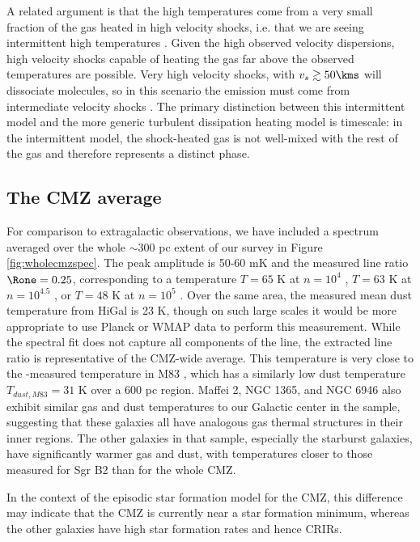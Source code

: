 A related argument is that the high temperatures come from a very small
fraction of the gas heated in high velocity shocks, i.e. that we are seeing
intermittent high temperatures \citep[e.g.][]{Falgarone1995a}.  Given the high
observed velocity dispersions, high velocity shocks capable of heating the gas
far above the observed temperatures are possible.  Very high velocity shocks,
with $v_s \gtrsim 50 \kms$ will dissociate molecules, so in this scenario the
emission must come from intermediate velocity shocks \citep{Neufeld1989a}.  The
primary distinction between this intermittent model and the more generic
turbulent dissipation heating model is timescale: in the intermittent model,
the shock-heated gas is not well-mixed with the rest of the gas and therefore
represents a distinct phase.  

\subsection{The CMZ average}
For comparison to extragalactic observations, we have included a spectrum
averaged over the whole $\sim300$ pc extent of our survey in Figure
\ref{fig:wholecmzspec}.  The peak amplitude is 50-60 mK and the measured
line ratio $\Rone = 0.25$, corresponding to a temperature $T=65$ K at $n=10^4$
\percc, $T=63$ K at $n=10^{4.5}$ \percc, or $T=48$ K at $n=10^5$ \percc.  
Over the same area, the measured mean dust temperature from HiGal is 23 K,
though on such large scales it would be more appropriate to use Planck or WMAP
data to perform this measurement.
While the spectral fit does not capture all components of the line, the
extracted line ratio is representative of the CMZ-wide average.  This
temperature is very close
to the \ammonia-measured temperature in M83 \citep[56 K;][]{Mangum2013a}, which
has a similarly low dust temperature $T_{dust,M83} = 31$ K over a 600 pc
region.  Maffei 2, NGC 1365, and NGC 6946 also exhibit similar gas and dust
temperatures to our Galactic center in the \citet{Mangum2013a} sample,
suggesting that these galaxies all have analogous gas thermal structures in
their inner regions.  The other galaxies in that sample, especially the
starburst galaxies, have significantly warmer gas and dust, with temperatures
closer to those measured for Sgr B2 than for the whole CMZ.

In the context of the \citet{Kruijssen2014c} episodic star formation model for
the CMZ, this difference may indicate that the CMZ is currently near a star
formation minimum, whereas the other galaxies have high star formation rates
and hence CRIRs.

